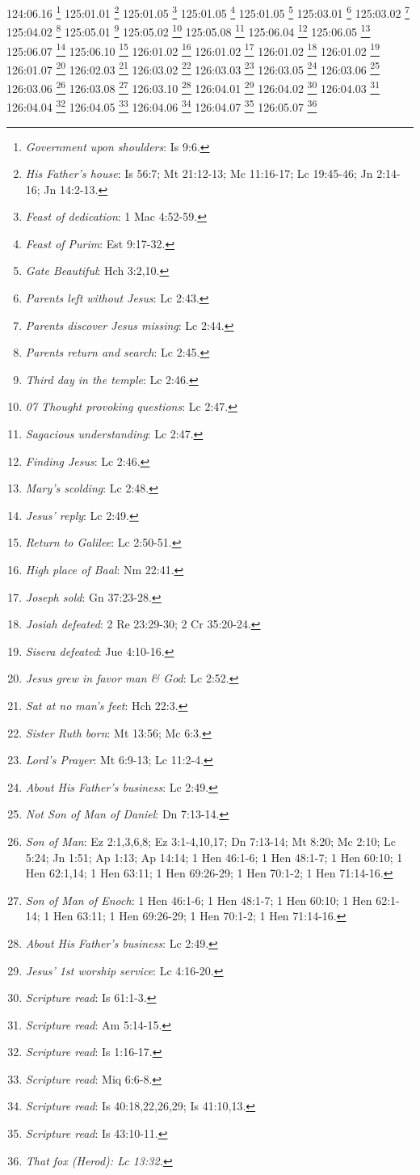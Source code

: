 {{{{{{{{{{{{{{{{{{{{{{{{{{{{{124:06.16 \footnote{\textit{Government upon shoulders}: Is 9:6.}
125:01.01 \footnote{\textit{His Father's house}: Is 56:7; Mt 21:12-13; Mc 11:16-17; Lc 19:45-46; Jn 2:14-16; Jn 14:2-13.}
125:01.05 \footnote{\textit{Feast of dedication}: 1 Mac 4:52-59.}
125:01.05 \footnote{\textit{Feast of Purim}: Est 9:17-32.}
125:01.05 \footnote{\textit{Gate Beautiful}: Hch 3:2,10.}
125:03.01 \footnote{\textit{Parents left without Jesus}: Lc 2:43.}
125:03.02 \footnote{\textit{Parents discover Jesus missing}: Lc 2:44.}
125:04.02 \footnote{\textit{Parents return and search}: Lc 2:45.}
125:05.01 \footnote{\textit{Third day in the temple}: Lc 2:46.}
125:05.02 \footnote{\textit{07 Thought provoking questions}: Lc 2:47.}
125:05.08 \footnote{\textit{Sagacious understanding}: Lc 2:47.}
125:06.04 \footnote{\textit{Finding Jesus}: Lc 2:46.}
125:06.05 \footnote{\textit{Mary's scolding}: Lc 2:48.}
125:06.07 \footnote{\textit{Jesus' reply}: Lc 2:49.}
125:06.10 \footnote{\textit{Return to Galilee}: Lc 2:50-51.}
126:01.02 \footnote{\textit{High place of Baal}: Nm 22:41.}
126:01.02 \footnote{\textit{Joseph sold}: Gn 37:23-28.}
126:01.02 \footnote{\textit{Josiah defeated}: 2 Re 23:29-30; 2 Cr 35:20-24.}
126:01.02 \footnote{\textit{Sisera defeated}: Jue 4:10-16.}
126:01.07 \footnote{\textit{Jesus grew in favor man & God}: Lc 2:52.}
126:02.03 \footnote{\textit{Sat at no man's feet}: Hch 22:3.}
126:03.02 \footnote{\textit{Sister Ruth born}: Mt 13:56; Mc 6:3.}
126:03.03 \footnote{\textit{Lord's Prayer}: Mt 6:9-13; Lc 11:2-4.}
126:03.05 \footnote{\textit{About His Father's business}: Lc 2:49.}
126:03.06 \footnote{\textit{Not Son of Man of Daniel}: Dn 7:13-14.}
126:03.06 \footnote{\textit{Son of Man}: Ez 2:1,3,6,8; Ez 3:1-4,10,17; Dn 7:13-14; Mt 8:20; Mc 2:10; Lc 5:24; Jn 1:51; Ap 1:13; Ap 14:14; 1 Hen 46:1-6; 1 Hen 48:1-7; 1 Hen 60:10; 1 Hen 62:1,14; 1 Hen 63:11; 1 Hen 69:26-29; 1 Hen 70:1-2; 1 Hen 71:14-16.}
126:03.08 \footnote{\textit{Son of Man of Enoch}: 1 Hen 46:1-6; 1 Hen 48:1-7; 1 Hen 60:10; 1 Hen 62:1-14; 1 Hen 63:11; 1 Hen 69:26-29; 1 Hen 70:1-2; 1 Hen 71:14-16.}
126:03.10 \footnote{\textit{About His Father's business}: Lc 2:49.}
126:04.01 \footnote{\textit{Jesus' 1st worship service}: Lc 4:16-20.}
126:04.02 \footnote{\textit{Scripture read}: Is 61:1-3.}
126:04.03 \footnote{\textit{Scripture read}: Am 5:14-15.}
126:04.04 \footnote{\textit{Scripture read}: Is 1:16-17.}
126:04.05 \footnote{\textit{Scripture read}: Miq 6:6-8.}
126:04.06 \footnote{\textit{Scripture read}: Is 40:18,22,26,29; Is 41:10,13.}
126:04.07 \footnote{\textit{Scripture read}: Is 43:10-11.}
126:05.07 \footnote{\textit{That fox (Herod): Lc 13:32.}
}}}}}}}}}}}}}}}}}}}}}}}}}}}}}}
